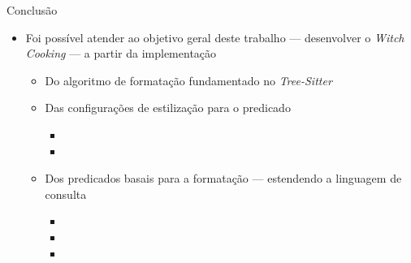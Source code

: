 \documentclass
  [ aspectratio=169,
    english,
    hyperref={citecolor=blue,colorlinks=true,linkcolor=blue,urlcolor=blue},
    brazil]
  {beamer}
\newcommand{\treesitter}{\textit{Tree-Sitter}\xspace}
\newcommand{\witchcooking}{\textit{Witch Cooking}\xspace}
\begin{document}
  \begin{frame}[fragile]{Conclusão}
    \begin{itemize}
      \item Foi possível atender ao objetivo geral deste trabalho ---
            desenvolver o \witchcooking{} --- a partir da implementação
            \begin{itemize}
              \item Do algoritmo de formatação fundamentado no \treesitter
              \item Das configurações de estilização para o predicado
                    \begin{itemize}
                      \item {}
                      \item {}
                    \end{itemize}
              \item Dos predicados basais para a formatação --- estendendo a
                    linguagem de consulta
                    \begin{itemize}
                      \item {}
                      \item {}
                      \item {}
                    \end{itemize}
            \end{itemize}
    \end{itemize}
  \end{frame}
\end{document}
